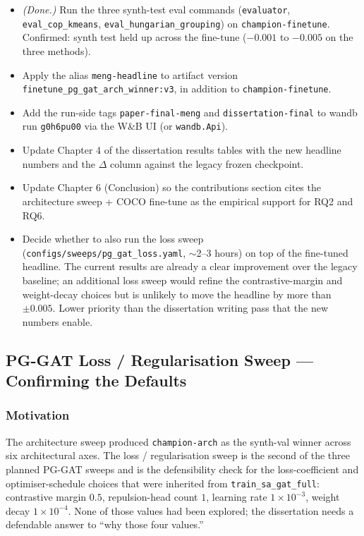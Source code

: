 \begin{itemize}
    \item \emph{(Done.)} Run the three synth-test eval commands (\texttt{evaluator}, \texttt{eval\_cop\_kmeans}, \texttt{eval\_hungarian\_grouping}) on \texttt{champion-finetune}. Confirmed: synth test held up across the fine-tune ($-0.001$ to $-0.005$ on the three methods).
    \item Apply the alias \texttt{meng-headline} to artifact version \texttt{finetune\_pg\_gat\_arch\_winner:v3}, in addition to \texttt{champion-finetune}.
    \item Add the run-side tags \texttt{paper-final-meng} and \texttt{dissertation-final} to wandb run \texttt{g0h6pu00} via the W\&B UI (or \texttt{wandb.Api}).
    \item Update Chapter 4 of the dissertation results tables with the new headline numbers and the $\Delta$ column against the legacy frozen checkpoint.
    \item Update Chapter 6 (Conclusion) so the contributions section cites the architecture sweep + COCO fine-tune as the empirical support for RQ2 and RQ6.
    \item Decide whether to also run the loss sweep (\texttt{configs/sweeps/pg\_gat\_loss.yaml}, $\sim$2--3 hours) on top of the fine-tuned headline. The current results are already a clear improvement over the legacy baseline; an additional loss sweep would refine the contrastive-margin and weight-decay choices but is unlikely to move the headline by more than $\pm 0.005$. Lower priority than the dissertation writing pass that the new numbers enable.
\end{itemize}

\subsection{PG-GAT Loss / Regularisation Sweep --- Confirming the Defaults}

\subsubsection{Motivation}

The architecture sweep produced \texttt{champion-arch} as the synth-val winner across six architectural axes.
The loss / regularisation sweep is the second of the three planned PG-GAT sweeps and is the defensibility check for the loss-coefficient and optimiser-schedule choices that were inherited from \texttt{train\_sa\_gat\_full}: contrastive margin $0.5$, repulsion-head count $1$, learning rate $1\!\times\!10^{-3}$, weight decay $1\!\times\!10^{-4}$.
None of those values had been explored; the dissertation needs a defendable answer to ``why those four values.''

